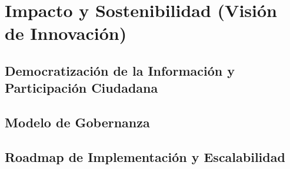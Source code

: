 \section{Impacto y Sostenibilidad (Visión de Innovación)}
\label{section:impacto-sostenibilidad}
\lipsum[14]

\subsection{Democratización de la Información y Participación Ciudadana}
\label{subsection:democratizacion-informacion-participacion}
\lipsum[15]

\subsection{Modelo de Gobernanza}
\label{subsection:modelo-gobernanza}
\lipsum[16]

\subsection{Roadmap de Implementación y Escalabilidad}
\label{subsection:roadmap-implementacion-escalabilidad}
\lipsum[17]